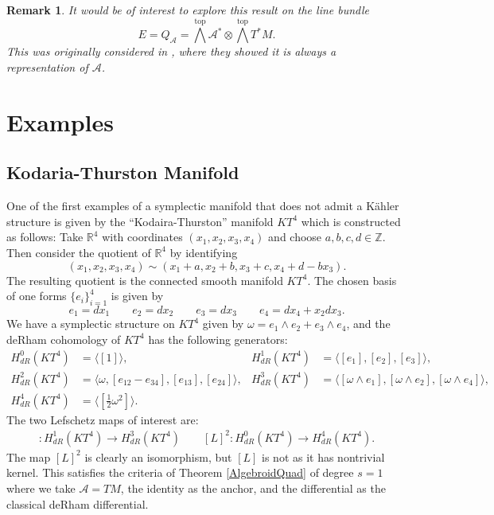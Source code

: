 \documentclass{amsart}
\newcommand{\Z}{\mathbb{Z}}
\newcommand{\R}{\mathbb{R}}
\newcommand{\ra}{\rightarrow}
\newtheorem{remark}[theorem]{Remark}
\newcommand{\A}{\mathcal{A}}
\theoremstyle{definition}
\begin{document}
\begin{remark}
    It would be of interest to explore this result on the line bundle
\begin{equation*}
    E = Q_\A =  \bigwedge^{\text{top}}\A^* \otimes \bigwedge^{\text{top}}T^*M.
\end{equation*}
This was originally considered in \cite{evens1996transversemeasuresmodularclass}, where they showed it is always a representation of $\A$.
\end{remark} 

\section{Examples}
\subsection{Kodaria-Thurston Manifold}
 One of the first examples of a symplectic manifold that does not admit a K\"ahler structure is given by the ``Kodaira-Thurston'' manifold $KT^4$ which is constructed as follows:
Take $\R^4$ with coordinates $(x_1,x_2,x_3,x_4)$ and choose $a,b,c,d \in \Z$. Then consider the quotient of $\R^4$ by identifying
    \begin{equation*}
        (x_1,x_2,x_3,x_4) \sim (x_1+a,x_2+b,x_3+c, x_4+d-bx_3).
    \end{equation*}
    The resulting quotient is the connected smooth manifold $KT^4$. The chosen basis of one forms $\{e_i\}_{i=1}^4 $ is given by
    \begin{equation*}
    e_1 = dx_1 \qquad e_2=dx_2 \qquad e_3 = dx_3 \qquad e_4 = dx_4 + x_2dx_3.
    \end{equation*}
    We have a symplectic structure on $KT^4$ given by $ \omega = e_1 \wedge e_2 + e_3 \wedge e_4$, and the deRham cohomology of $KT^4$ has the following generators:
    \begin{align*}
    H_{dR}^0(KT^4) &= \langle [1] \rangle, & H_{dR}^1(KT^4) &= \langle [e_1], [e_2], [e_3] \rangle, \\
    H_{dR}^2(KT^4) &= \langle \omega , [e_{12} - e_{34}] , [e_{13}], [e_{24}] \rangle, & H_{dR}^3(KT^4) &=\langle [\omega \wedge e_1] ,[\omega \wedge e_2],[\omega \wedge e_4]\rangle, \\
    H_{dR}^4(KT^4)&= \langle [\frac{1}{2}\omega^2] \rangle.
\end{align*}
The two Lefschetz maps of interest are:
\begin{align*}
    [L]:H_{dR}^1(KT^4) \ra H_{dR}^3(KT^4)  \qquad  [L]^2:H_{dR}^0(KT^4) \ra H_{dR}^4(KT^4).
\end{align*}
The map $[L]^2$ is clearly an isomorphism, but $[L]$ is not as it has nontrivial kernel. This satisfies the criteria of Theorem \ref{AlgebroidQuad} of degree $s=1$ where we take $\A=TM$, the identity as the anchor, and the differential as the classical deRham differential.
\end{document}
